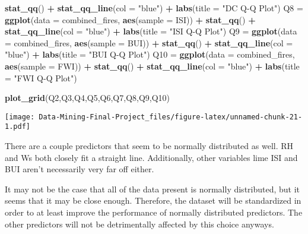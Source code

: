 \documentclass[
]{article}
\newenvironment{Shaded}{\begin{snugshade}}{\end{snugshade}}
\newcommand{\AttributeTok}[1]{\textcolor[rgb]{0.13,0.29,0.53}{#1}}
\newcommand{\FunctionTok}[1]{\textcolor[rgb]{0.13,0.29,0.53}{\textbf{#1}}}
\newcommand{\NormalTok}[1]{#1}
\newcommand{\OtherTok}[1]{\textcolor[rgb]{0.56,0.35,0.01}{#1}}
\newcommand{\SpecialCharTok}[1]{\textcolor[rgb]{0.81,0.36,0.00}{\textbf{#1}}}
\newcommand{\StringTok}[1]{\textcolor[rgb]{0.31,0.60,0.02}{#1}}
\begin{document}
\begin{Shaded}
\begin{Highlighting}[]
  \FunctionTok{stat\_qq}\NormalTok{() }\SpecialCharTok{+}
  \FunctionTok{stat\_qq\_line}\NormalTok{(}\AttributeTok{col =} \StringTok{"blue"}\NormalTok{) }\SpecialCharTok{+}
  \FunctionTok{labs}\NormalTok{(}\AttributeTok{title =} \StringTok{"DC Q{-}Q Plot"}\NormalTok{)}
\NormalTok{Q8 }\OtherTok{=} \FunctionTok{ggplot}\NormalTok{(}\AttributeTok{data =}\NormalTok{ combined\_fires, }\FunctionTok{aes}\NormalTok{(}\AttributeTok{sample =}\NormalTok{ ISI)) }\SpecialCharTok{+}
  \FunctionTok{stat\_qq}\NormalTok{() }\SpecialCharTok{+}
  \FunctionTok{stat\_qq\_line}\NormalTok{(}\AttributeTok{col =} \StringTok{"blue"}\NormalTok{) }\SpecialCharTok{+}
  \FunctionTok{labs}\NormalTok{(}\AttributeTok{title =} \StringTok{"ISI Q{-}Q Plot"}\NormalTok{)}
\NormalTok{Q9 }\OtherTok{=} \FunctionTok{ggplot}\NormalTok{(}\AttributeTok{data =}\NormalTok{ combined\_fires, }\FunctionTok{aes}\NormalTok{(}\AttributeTok{sample =}\NormalTok{ BUI)) }\SpecialCharTok{+}
  \FunctionTok{stat\_qq}\NormalTok{() }\SpecialCharTok{+}
  \FunctionTok{stat\_qq\_line}\NormalTok{(}\AttributeTok{col =} \StringTok{"blue"}\NormalTok{) }\SpecialCharTok{+}
  \FunctionTok{labs}\NormalTok{(}\AttributeTok{title =} \StringTok{"BUI Q{-}Q Plot"}\NormalTok{)}
\NormalTok{Q10 }\OtherTok{=} \FunctionTok{ggplot}\NormalTok{(}\AttributeTok{data =}\NormalTok{ combined\_fires, }\FunctionTok{aes}\NormalTok{(}\AttributeTok{sample =}\NormalTok{ FWI)) }\SpecialCharTok{+}
  \FunctionTok{stat\_qq}\NormalTok{() }\SpecialCharTok{+}
  \FunctionTok{stat\_qq\_line}\NormalTok{(}\AttributeTok{col =} \StringTok{"blue"}\NormalTok{) }\SpecialCharTok{+}
  \FunctionTok{labs}\NormalTok{(}\AttributeTok{title =} \StringTok{"FWI Q{-}Q Plot"}\NormalTok{)}

\FunctionTok{plot\_grid}\NormalTok{(Q2,Q3,Q4,Q5,Q6,Q7,Q8,Q9,Q10)}
\end{Highlighting}
\end{Shaded}

\texttt{[image: Data-Mining-Final-Project\_files/figure-latex/unnamed-chunk-21-1.pdf]}

There are a couple predictors that seem to be normally distributed as
well. RH and Ws both closely fit a straight line. Additionally, other
variables lime ISI and BUI aren't necessarily very far off either.

It may not be the case that all of the data present is normally
distributed, but it seems that it may be close enough. Therefore, the
dataset will be standardized in order to at least improve the
performance of normally distributed predictors. The other predictors
will not be detrimentally affected by this choice anyways.
\end{document}
